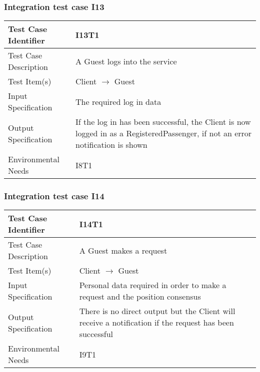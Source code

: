 		\subsubsection{Integration test case I13}
		\begin{center}
			\begin{tabular}{ |l p{10cm}| } \hline
				Test Case Identifier & I13T1 \\ \hline
				Test Case Description & A Guest logs into the service \\ \hline
				Test Item(s) & Client $\rightarrow$ Guest \\ \hline
				Input Specification & The required log in data \\ \hline
				Output Specification & If the log in has been successful, the Client is now logged in as a RegisteredPassenger, if not
				an error notification is shown\\ \hline
				Environmental Needs & I8T1 \\ \hline
			\end{tabular}
		\end{center}
		\subsubsection{Integration test case I14}
		\begin{center}
			\begin{tabular}{ |l p{10cm}| } \hline
				Test Case Identifier & I14T1 \\ \hline
				Test Case Description & A Guest makes a request \\ \hline
				Test Item(s) & Client $\rightarrow$ Guest \\ \hline
				Input Specification & Personal data required in order to make a request and the position consensus \\ \hline
				Output Specification & There is no direct output but the Client will receive a notification if the request has been successful \\ \hline
				Environmental Needs & I9T1 \\ \hline
			\end{tabular}
		\end{center}
